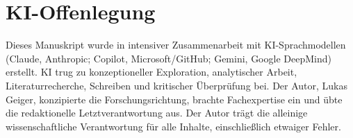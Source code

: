 \documentclass[12pt,a4paper]{article}
\theoremstyle{definition}
\theoremstyle{remark}
\begin{document}
\section*{KI-Offenlegung}

Dieses Manuskript wurde in intensiver Zusammenarbeit mit KI-Sprachmodellen
(Claude, Anthropic; Copilot, Microsoft/GitHub; Gemini, Google DeepMind)
erstellt. KI trug zu konzeptioneller Exploration, analytischer Arbeit,
Literaturrecherche, Schreiben und kritischer Überprüfung bei. Der Autor,
Lukas Geiger, konzipierte die Forschungsrichtung, brachte Fachexpertise
ein und übte die redaktionelle Letztverantwortung aus. Der Autor trägt die
alleinige wissenschaftliche Verantwortung für alle Inhalte, einschließlich
etwaiger Fehler.




\end{document}

